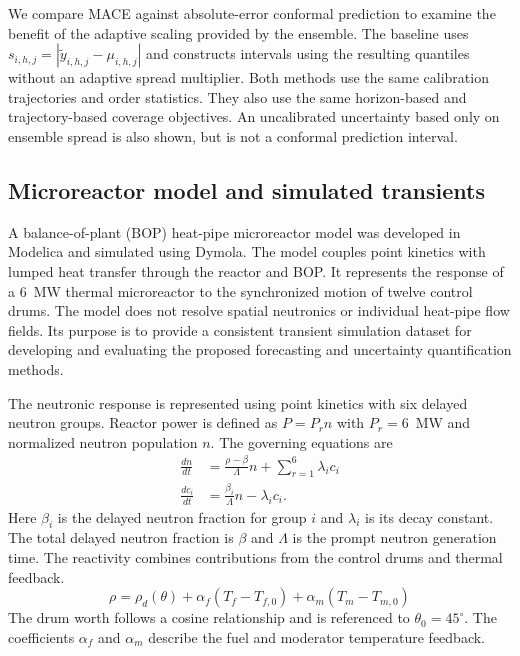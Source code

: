 We compare MACE against absolute-error conformal prediction to examine the benefit of the adaptive scaling provided by the ensemble. The baseline uses $s_{i,h,j}=|\widetilde y_{i,h,j}-\mu_{i,h,j}|$ and constructs intervals using the resulting quantiles without an adaptive spread multiplier. Both methods use the same calibration trajectories and order statistics. They also use the same horizon-based and trajectory-based coverage objectives. An uncalibrated uncertainty based only on ensemble spread is also shown, but is not a conformal prediction interval.

\subsection{Microreactor model and simulated transients}
\label{sec:methods:plant}

A balance-of-plant (BOP) heat-pipe microreactor model was developed in Modelica and simulated using Dymola. The model couples point kinetics with lumped heat transfer through the reactor and BOP. It represents the response of a 6~MW thermal microreactor to the synchronized motion of twelve control drums. The model does not resolve spatial neutronics or individual heat-pipe flow fields. Its purpose is to provide a consistent transient simulation dataset for developing and evaluating the proposed forecasting and uncertainty quantification methods.

The neutronic response is represented using point kinetics with six delayed neutron groups. Reactor power is defined as $P=P_r n$ with $P_r=6$~MW and normalized neutron population $n$. The governing equations are
\begin{equation}
 \begin{aligned}
 \frac{dn}{dt}&=\frac{\rho-\beta}{\Lambda}n+
                 \sum_{r=1}^{6}\lambda_i c_i\\
 \frac{dc_i}{dt}&=\frac{\beta_i}{\Lambda}n-\lambda_i c_i.
 \end{aligned}
 \label{eq:mace:kinetics}
\end{equation}
Here $\beta_i$ is the delayed neutron fraction for group $i$ and $\lambda_i$ is its decay constant. The total delayed neutron fraction is $\beta$ and $\Lambda$ is the prompt neutron generation time. The reactivity combines contributions from the control drums and thermal feedback.
\begin{equation}
 \rho=\rho_d(\theta)+
       \alpha_f(T_f-T_{f,0})+
       \alpha_m(T_m-T_{m,0})
 \label{eq:mace:reactivity}
\end{equation}
The drum worth follows a cosine relationship and is referenced to $\theta_0=45^\circ$. The coefficients $\alpha_f$ and $\alpha_m$ describe the fuel and moderator temperature feedback.

